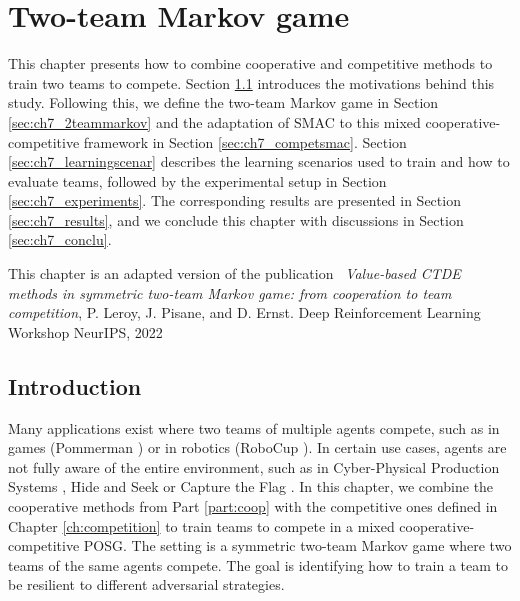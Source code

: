 \chapter{Two-team Markov game}\label{ch:2teams}
\begin{chapter_outline}

This chapter presents how to combine cooperative and competitive methods to train two teams to compete.
Section \ref{sec:ch7_intro} introduces the motivations behind this study.
Following this, we define the two-team Markov game in Section \ref{sec:ch7_2teammarkov} and the adaptation of SMAC to this mixed cooperative-competitive framework in Section \ref{sec:ch7_competsmac}.
Section \ref{sec:ch7_learningscenar} describes the learning scenarios used to train and how to evaluate teams, followed by the experimental setup in Section \ref{sec:ch7_experiments}.
The corresponding results are presented in Section \ref{sec:ch7_results}, and we conclude this chapter with discussions in Section \ref{sec:ch7_conclu}.

This chapter is an adapted version of the publication~\citep{leroy2022twoteam} \textit{Value-based CTDE methods in symmetric two-team Markov game: from cooperation to team competition}, P. Leroy, J. Pisane, and D. Ernst. Deep Reinforcement Learning Workshop NeurIPS, 2022

\end{chapter_outline}

\section{Introduction} \label{sec:ch7_intro}

Many applications exist where two teams of multiple agents compete, such as in games (Pommerman \citep{resnick2018pommerman}) or in robotics (RoboCup \citep{kitano1997robocup}).
In certain use cases, agents are not fully aware of the entire environment, such as in Cyber-Physical Production Systems \citep{phan2020learning}, Hide and Seek \citep{baker2019emergent} or Capture the Flag \citep{jaderberg2019human}.
In this chapter, we combine the cooperative methods from Part \ref{part:coop} with the competitive ones defined in Chapter \ref{ch:competition} to train teams to compete in a mixed cooperative-competitive POSG.
The setting is a symmetric two-team Markov game where two teams of the same agents compete.
The goal is identifying how to train a team to be resilient to different adversarial strategies.

